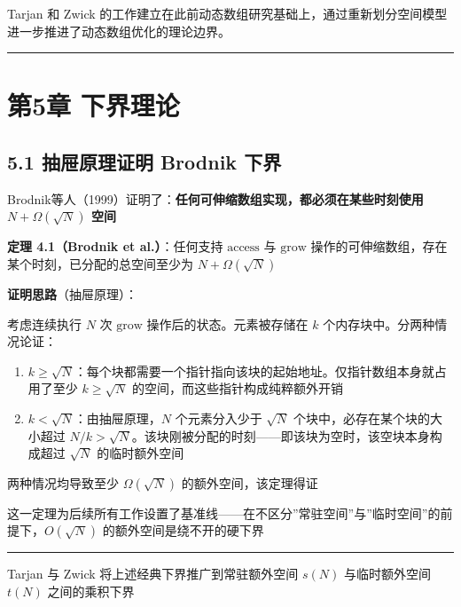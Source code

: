 \documentclass[
  UTF8,
  a4paper,
  12pt]{ctexart}
\begin{document}
Tarjan 和 Zwick
的工作建立在此前动态数组研究基础上，通过重新划分空间模型进一步推进了动态数组优化的理论边界。

\begin{center}\rule{0.5\linewidth}{0.5pt}\end{center}

\section{第5章 下界理论}\label{ux7b2c5ux7ae0-ux4e0bux754cux7406ux8bba}

\subsection{5.1 抽屉原理证明 Brodnik
下界}\label{ux62bdux5c49ux539fux7406ux8bc1ux660e-brodnik-ux4e0bux754c}

Brodnik等人（1999）证明了：\textbf{任何可伸缩数组实现，都必须在某些时刻使用
\(N + \Omega(\sqrt{N})\) 空间}

\textbf{定理 4.1（Brodnik et al.）}：任何支持 \(\text{access}\) 与
\(\text{grow}\) 操作的可伸缩数组，存在某个时刻，已分配的总空间至少为
\(N + \Omega(\sqrt{N})\)

\textbf{证明思路}（抽屉原理）：

考虑连续执行 \(N\) 次 \(\text{grow}\) 操作后的状态。元素被存储在 \(k\)
个内存块中。分两种情况论证：

\begin{enumerate}
\def\labelenumi{\arabic{enumi}.}
\item
  \textbf{\(k \ge \sqrt{N}\)}：每个块都需要一个指针指向该块的起始地址。仅指针数组本身就占用了至少
  \(k \ge \sqrt{N}\) 的空间，而这些指针构成纯粹额外开销
\item
  \textbf{\(k < \sqrt{N}\)}：由抽屉原理，\(N\) 个元素分入少于
  \(\sqrt{N}\) 个块中，必存在某个块的大小超过
  \(N/k > \sqrt{N}\)。该块刚被分配的时刻------即该块为空时，该空块本身构成超过
  \(\sqrt{N}\) 的临时额外空间
\end{enumerate}

两种情况均导致至少 \(\Omega(\sqrt{N})\) 的额外空间，该定理得证

这一定理为后续所有工作设置了基准线------在不区分''常驻空间''与''临时空间''的前提下，\(O(\sqrt{N})\)
的额外空间是绕不开的硬下界

\begin{center}\rule{0.5\linewidth}{0.5pt}\end{center}

Tarjan 与 Zwick 将上述经典下界推广到常驻额外空间 \(s(N)\) 与临时额外空间
\(t(N)\) 之间的乘积下界
\end{document}
